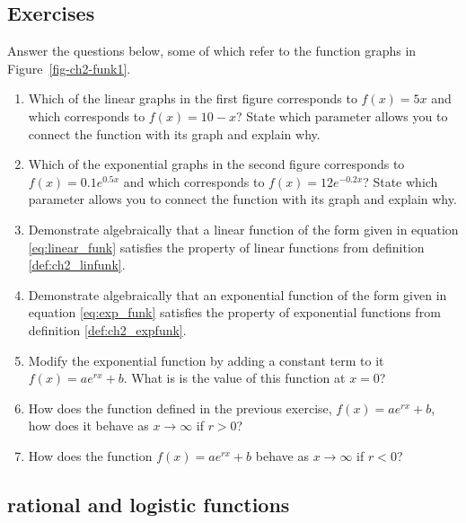 \documentclass[
  letterpaper,
  DIV=11,
  numbers=noendperiod]{scrreprt}
\begin{document}
\hypertarget{exercises-3}{%
\subsection{Exercises}\label{exercises-3}}

Answer the questions below, some of which refer to the function graphs
in Figure~\ref{fig-ch2-funk1}.

\begin{enumerate}
\def\labelenumi{\arabic{enumi}.}
\item
  Which of the linear graphs in the first figure corresponds to
  \(f(x) = 5x\) and which corresponds to \(f(x) = 10-x\)? State which
  parameter allows you to connect the function with its graph and
  explain why.
\item
  Which of the exponential graphs in the second figure corresponds to
  \(f(x) = 0.1e^{0.5x}\) and which corresponds to
  \(f(x) = 12e^{-0.2x}\)? State which parameter allows you to connect
  the function with its graph and explain why.
\item
  Demonstrate algebraically that a linear function of the form given in
  equation \ref{eq:linear_funk} satisfies the property of linear
  functions from definition \ref {def:ch2_linfunk}.
\item
  Demonstrate algebraically that an exponential function of the form
  given in equation \ref{eq:exp_funk} satisfies the property of
  exponential functions from definition \ref {def:ch2_expfunk}.
\item
  Modify the exponential function by adding a constant term to it
  \(f(x) = a e^{rx} + b\). What is is the value of this function at
  \(x=0\)?
\item
  How does the function defined in the previous exercise,
  \(f(x) = a e^{rx} + b\), how does it behave as \(x \to \infty\) if
  \(r>0\)?
\item
  How does the function \(f(x) = a e^{rx} + b\) behave as
  \(x \to \infty\) if \(r<0\)?
\end{enumerate}

\hypertarget{rational-and-logistic-functions}{%
\subsection{rational and logistic
functions}\label{rational-and-logistic-functions}}
\end{document}
